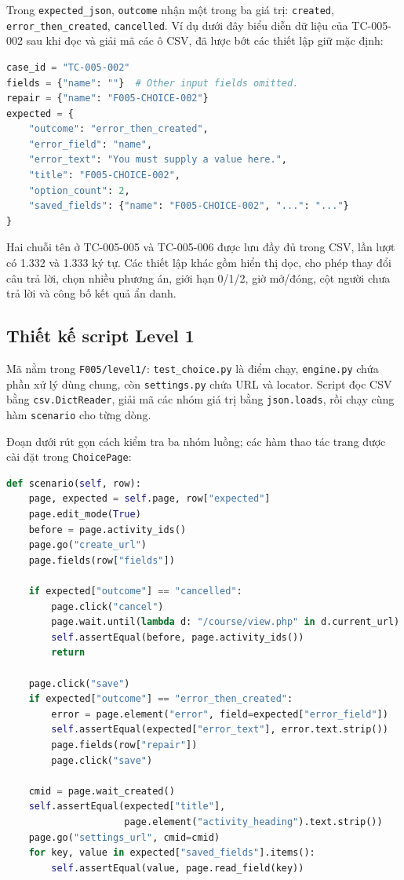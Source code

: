 \documentclass[12pt,a4paper]{article}
\begin{document}
Trong \texttt{expected\_json}, \texttt{outcome} nhận một trong ba giá trị:
\texttt{created}, \texttt{error\_then\_created}, \texttt{cancelled}.
Ví dụ dưới đây biểu diễn dữ liệu của TC-005-002 sau khi đọc và giải mã các ô CSV, đã lược bớt
các thiết lập giữ mặc định:

\begin{lstlisting}[language=Python]
case_id = "TC-005-002"
fields = {"name": ""}  # Other input fields omitted.
repair = {"name": "F005-CHOICE-002"}
expected = {
    "outcome": "error_then_created",
    "error_field": "name",
    "error_text": "You must supply a value here.",
    "title": "F005-CHOICE-002",
    "option_count": 2,
    "saved_fields": {"name": "F005-CHOICE-002", "...": "..."}
}
\end{lstlisting}
Hai chuỗi tên ở TC-005-005 và TC-005-006 được lưu đầy đủ trong CSV, lần lượt có 1.332 và 1.333
ký tự. Các thiết lập khác gồm hiển thị dọc, cho phép thay đổi câu trả lời, chọn nhiều phương án,
giới hạn 0/1/2, giờ mở/đóng, cột người chưa trả lời và công bố kết quả ẩn danh.

\subsection{Thiết kế script Level 1}
Mã nằm trong \texttt{F005/level1/}: \texttt{test\_choice.py} là điểm chạy,
\texttt{engine.py} chứa phần xử lý dùng chung, còn \texttt{settings.py} chứa URL và locator.
Script đọc CSV bằng \texttt{csv.DictReader}, giải mã các nhóm giá trị bằng \texttt{json.loads},
rồi chạy cùng hàm \texttt{scenario} cho từng dòng.

Đoạn dưới rút gọn cách kiểm tra ba nhóm luồng; các hàm thao tác trang được cài đặt trong
\texttt{ChoicePage}:

\begin{lstlisting}[language=Python]
def scenario(self, row):
    page, expected = self.page, row["expected"]
    page.edit_mode(True)
    before = page.activity_ids()
    page.go("create_url")
    page.fields(row["fields"])

    if expected["outcome"] == "cancelled":
        page.click("cancel")
        page.wait.until(lambda d: "/course/view.php" in d.current_url)
        self.assertEqual(before, page.activity_ids())
        return

    page.click("save")
    if expected["outcome"] == "error_then_created":
        error = page.element("error", field=expected["error_field"])
        self.assertEqual(expected["error_text"], error.text.strip())
        page.fields(row["repair"])
        page.click("save")

    cmid = page.wait_created()
    self.assertEqual(expected["title"],
                     page.element("activity_heading").text.strip())
    page.go("settings_url", cmid=cmid)
    for key, value in expected["saved_fields"].items():
        self.assertEqual(value, page.read_field(key))
\end{lstlisting}
\end{document}
